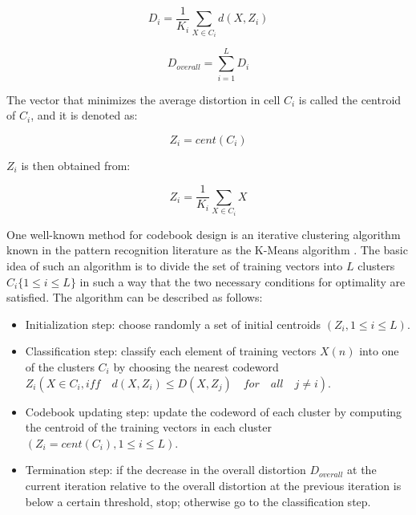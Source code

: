 \documentclass{article}[14pt, oneside, a4paper, times]
\begin{document}
\begin{equation}
    D_i=\frac{1}{K_i} \sum_{X \in C_i} d(X,Z_i)
\end{equation}

\begin{equation}
    D_{overall}= \sum_{i=1}^L D_i
    \label{EQ:overall-average-distortion}
\end{equation}

The vector that minimizes the average distortion in cell $C_i$ is called the centroid of $C_i$, and it is denoted as:

\begin{equation}
    Z_i=cent(C_i)
\end{equation}

\noindent $Z_i$ is then obtained from:

\begin{equation}
    Z_i=\frac{1}{K_i} \sum_{X \in C_i} X
\end{equation}

One well-known method for codebook design is an iterative clustering algorithm known in the pattern recognition literature as the K-Means algorithm \cite{Huang90}. The basic idea of such an algorithm is to divide the set of training vectors into $L$ clusters $C_i \{1 \leq i \leq L\}$ in such a way that the two necessary conditions for optimality are satisfied. The algorithm can be described as follows:

\begin{itemize}

\item   Initialization step: choose randomly a set of initial centroids
        $(Z_i, 1 \leq i \leq L)$.

\item   Classification step: classify each element of training vectors $X(n)$
        into one of the clusters $C_i$ by choosing the nearest codeword
        $Z_i (X \in C_i, iff \quad d(X,Z_i) \leq D(X,Z_j) \quad for \quad all \quad j \neq i)$.

\item   Codebook updating step: update the codeword of each cluster by computing
        the centroid of the training vectors in each cluster
        $(Z_i=cent(C_i), 1 \leq i \leq L)$.

\item   Termination step: if the decrease in the overall distortion
        $D_{overall}$ at the current iteration relative to the overall distortion at
        the previous iteration is below a certain threshold, stop;
        otherwise go to the classification step.

\end{itemize}
\end{document}
